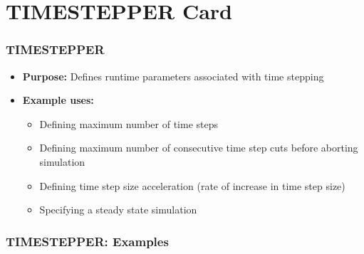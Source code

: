 \section{TIMESTEPPER Card}

\begin{frame}\frametitle{TIMESTEPPER}

\begin{itemize}
\item[] \textbf{Purpose:} Defines runtime parameters associated with time stepping
\item[] \textbf{Example uses:}
\begin{itemize}
  \item Defining maximum number of time steps
  \item Defining maximum number of consecutive time step cuts before aborting simulation
  \item Defining time step size acceleration (rate of increase in time step size)
  \item Specifying a steady state simulation
\end{itemize}
\end{itemize}

\end{frame}

\begin{frame}[fragile]\frametitle{TIMESTEPPER: Examples}

\end{frame}
